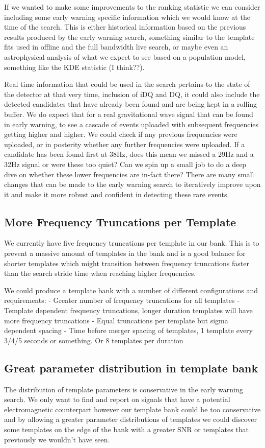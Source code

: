 If we wanted to make some improvements to the ranking statistic we can consider including some early warning specific information which we would know at the time of the search. This is either historical information based on the previous results produced by the early warning search, something similar to the template fits used in offline and the full bandwidth live search, or maybe even an astrophysical analysis of what we expect to see based on a population model, something like the KDE statistic (I think??).

Real time information that could be used in the search pertains to the state of the detector at that very time, inclusion of iDQ and DQ, it could also include the detected candidates that have already been found and are being kept in a rolling buffer. We do expect that for a real gravitational wave signal that can be found in early warning, to see a cascade of events uploaded with subsequent frequencies getting higher and higher. We could check if any previous frequencies were uploaded, or in posterity whether any further frequencies were uploaded. If a candidate has been found first at 38Hz, does this mean we missed a 29Hz and a 32Hz signal or were these too quiet? Can we spin up a small job to do a deep dive on whether these lower frequencies are in-fact there? There are many small changes that can be made to the early warning search to iteratively improve upon it and make it more robust and confident in detecting these rare events.

\subsection{More Frequency Truncations per Template}
We currently have five frequency truncations per template in our bank. This is to prevent a massive amount of templates in the bank and is a good balance for shorter templates which might transition between frequency truncations faster than the search stride time when reaching higher frequencies.

We could produce a template bank with a number of different configurations and requirements:
- Greater number of frequency truncations for all templates
- Template dependent frequency truncations, longer duration templates will have more frequency truncations
- Equal truncations per template but sigma dependent spacing
- Time before merger spacing of templates, 1 template every 3/4/5 seconds or something. Or 8 templates per duration

\subsection{Great parameter distribution in template bank}
The distribution of template parameters is conservative in the early warning search. We only want to find and report on signals that have a potential electromagnetic counterpart however our template bank could be too conservative and by allowing a greater parameter distributions of templates we could discover some templates on the edge of the bank with a greater SNR or templates that previously we wouldn't have seen.

